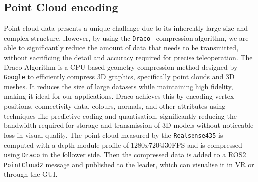 \subsection{Point Cloud encoding}
Point cloud data presents a unique challenge due to its inherently large size and complex structure. However, by using the \verb|Draco|~\cite{frank2024Draco} compression algorithm, we are able to significantly reduce the amount of data that needs to be transmitted, without sacrificing the detail and accuracy required for precise teleoperation.
The Draco Algorithm is a CPU-based geometry compression method designed by \verb|Google| to efficiently compress 3D graphics, specifically point clouds and 3D meshes. It reduces the size of large datasets while maintaining high fidelity, making it ideal for our applications. Draco achieves this by encoding vertex positions, connectivity data, colours, normals, and other attributes using techniques like predictive coding and quantisation, significantly reducing the bandwidth required for storage and transmission of 3D models without noticeable loss in visual quality.
The point cloud measured by the \verb|Realsense435| is computed with a depth module profile of $1280x720$@$30$FPS and is compressed using \verb|Draco| in the follower side. Then the compressed data is added to a ROS2 \verb|PointCloud2| message and published to the leader, which can visualise it in VR or through the GUI.